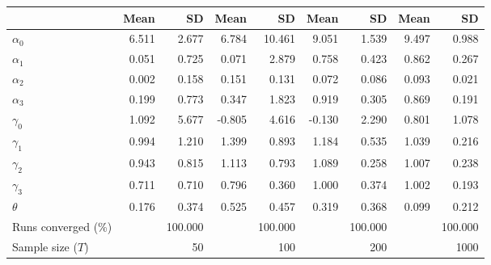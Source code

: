 
\begin{tabular}[t]{lrrrrrrrr}
\toprule
  & Mean & SD & Mean  & SD  & Mean   & SD   & Mean    & SD   \\
\midrule
$\alpha_{0}$ & 6.511 & 2.677 & 6.784 & 10.461 & 9.051 & 1.539 & 9.497 & 0.988\\
$\alpha_{1}$ & 0.051 & 0.725 & 0.071 & 2.879 & 0.758 & 0.423 & 0.862 & 0.267\\
$\alpha_{2}$ & 0.002 & 0.158 & 0.151 & 0.131 & 0.072 & 0.086 & 0.093 & 0.021\\
$\alpha_{3}$ & 0.199 & 0.773 & 0.347 & 1.823 & 0.919 & 0.305 & 0.869 & 0.191\\
$\gamma_{0}$ & 1.092 & 5.677 & -0.805 & 4.616 & -0.130 & 2.290 & 0.801 & 1.078\\
$\gamma_{1}$ & 0.994 & 1.210 & 1.399 & 0.893 & 1.184 & 0.535 & 1.039 & 0.216\\
$\gamma_{2}$ & 0.943 & 0.815 & 1.113 & 0.793 & 1.089 & 0.258 & 1.007 & 0.238\\
$\gamma_{3}$ & 0.711 & 0.710 & 0.796 & 0.360 & 1.000 & 0.374 & 1.002 & 0.193\\
$\theta$ & 0.176 & 0.374 & 0.525 & 0.457 & 0.319 & 0.368 & 0.099 & 0.212\\
Runs converged (\%) &  & 100.000 &  & 100.000 &  & 100.000 &  & 100.000\\
Sample size ($T$) &  & 50 &  & 100 &  & 200 &  & 1000\\
\bottomrule
\end{tabular}
